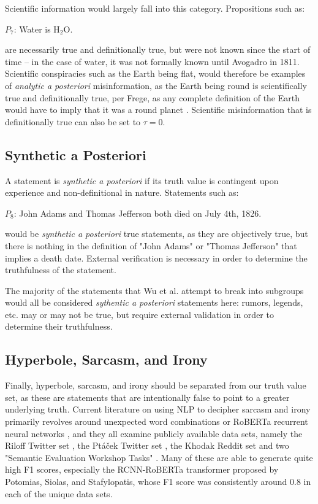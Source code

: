 \documentclass[preprint,review,12pt]{elsarticle}
\begin{document}
Scientific information would largely fall into this category. Propositions such as: 
\begin{center}
    $P_7$: Water is H$_2$O.
\end{center} 
are necessarily true and definitionally true, but were not known since the start of time -- in the case of water, it was not formally known until Avogadro in 1811. Scientific conspiracies such as the Earth being flat, would therefore be examples of \textit{analytic a posteriori} misinformation, as the Earth being round is scientifically true and definitionally true, per Frege, as any complete definition of the Earth would have to imply that it was a round planet \cite{frege2003sense}. Scientific misinformation that is definitionally true can also be set to $\tau = 0$.

\subsection{Synthetic a Posteriori}
A statement is \textit{synthetic a posteriori} if its truth value is contingent upon experience and non-definitional in nature. Statements such as: \begin{center}
    $P_8$: John Adams and Thomas Jefferson both died on July 4th, 1826.
\end{center}

would be \textit{synthetic a posteriori} true statements, as they are objectively true, but there is nothing in the definition of "John Adams" or "Thomas Jefferson" that implies a death date. External verification is necessary in order to determine the truthfulness of the statement.

The majority of the statements that Wu et al. attempt to break into subgroups would all be considered \textit{sythentic a posteriori} statements here: rumors, legends, etc. may or may not be true, but require external validation in order to determine their truthfulness.

\subsection{Hyperbole, Sarcasm, and Irony}
\label{hyperbole}
Finally, hyperbole, sarcasm, and irony should be separated from our truth value set, as these are statements that are intentionally false to point to a greater underlying truth. 
Current literature on using NLP to decipher sarcasm and irony primarily revolves around unexpected word combinations \cite{barbieri2014modelling,buschmeier2014impact,ghosh2015sarcastic} or RoBERTa recurrent neural networks \cite{potamias2020transformer}, and they all examine publicly available data sets, namely the Riloff Twitter set \cite{riloff2013sarcasm}, the Pt{\'a}{\v{c}}ek Twitter set \cite{ptavcek2014sarcasm}, the Khodak Reddit set \cite{khodak2017large} and two "Semantic Evaluation Workshop Tasks" \cite{van2018semeval,ghosh2015semeval}. Many of these are able to generate quite high F1 scores, especially the RCNN-RoBERTa transformer proposed by Potomias, Siolas, and Stafylopatis, whose F1 score was consistently around 0.8 in each of the unique data sets. 
\end{document}
